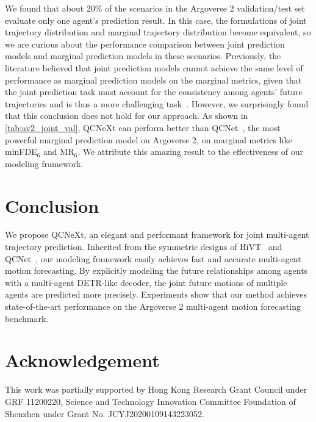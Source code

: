 \documentclass[10pt,twocolumn,letterpaper]{article}
\begin{document}
We found that about 20\% of the scenarios in the Argoverse 2 validation/test set evaluate only one agent's prediction result. In this case, the formulations of joint trajectory distribution and marginal trajectory distribution become equivalent, so we are curious about the performance comparison between joint prediction models and marginal prediction models in these scenarios. Previously, the literature believed that joint prediction models cannot achieve the same level of performance as marginal prediction models on the marginal metrics, given that the joint prediction task must account for the consistency among agents' future trajectories and is thus a more challenging task~\cite{ngiam2021scene}. However, we surprisingly found that this conclusion does not hold for our approach. As shown in \cref{tab:av2_joint_val}, QCNeXt can perform better than QCNet~\cite{zhou2023query}, the most powerful marginal prediction model on Argoverse 2, on marginal metrics like minFDE${}_6$ and MR${}_6$. We attribute this amazing result to the effectiveness of our modeling framework.

\section{Conclusion}

We propose QCNeXt, an elegant and performant framework for joint multi-agent trajectory prediction. Inherited from the symmetric designs of HiVT~\cite{zhou2022hivt} and QCNet~\cite{zhou2023query}, our modeling framework easily achieves fast and accurate multi-agent motion forecasting. By explicitly modeling the future relationships among agents with a multi-agent DETR-like decoder, the joint future motions of multiple agents are predicted more precisely. Experiments show that our method achieves state-of-the-art performance on the Argoverse 2 multi-agent motion forecasting benchmark.

\section*{Acknowledgement}

This work was partially supported by Hong Kong Research Grant Council under GRF 11200220, Science and Technology Innovation Committee Foundation of Shenzhen under Grant No. JCYJ20200109143223052.


{\small


}
\end{document}
